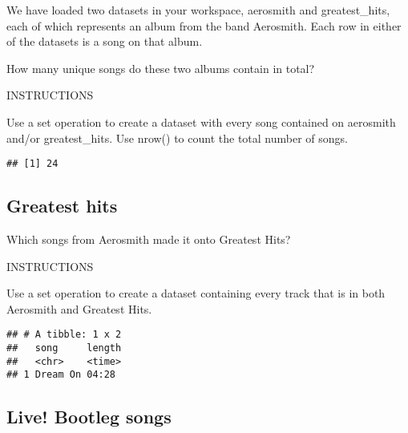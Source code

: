\documentclass[]{article}
\newenvironment{Shaded}{\begin{snugshade}}{\end{snugshade}}
\newcommand{\KeywordTok}[1]{\textcolor[rgb]{0.13,0.29,0.53}{\textbf{#1}}}
\newcommand{\StringTok}[1]{\textcolor[rgb]{0.31,0.60,0.02}{#1}}
\newcommand{\CommentTok}[1]{\textcolor[rgb]{0.56,0.35,0.01}{\textit{#1}}}
\newcommand{\OperatorTok}[1]{\textcolor[rgb]{0.81,0.36,0.00}{\textbf{#1}}}
\newcommand{\NormalTok}[1]{#1}
\begin{document}
We have loaded two datasets in your workspace, aerosmith and
greatest\_hits, each of which represents an album from the band
Aerosmith. Each row in either of the datasets is a song on that album.

How many unique songs do these two albums contain in total?

INSTRUCTIONS

Use a set operation to create a dataset with every song contained on
aerosmith and/or greatest\_hits. Use nrow() to count the total number of
songs.

\begin{Shaded}
\end{Shaded}

\begin{verbatim}
## [1] 24
\end{verbatim}

\subsection{Greatest hits}\label{greatest-hits}

Which songs from Aerosmith made it onto Greatest Hits?

INSTRUCTIONS

Use a set operation to create a dataset containing every track that is
in both Aerosmith and Greatest Hits.

\begin{Shaded}
\end{Shaded}

\begin{verbatim}
## # A tibble: 1 x 2
##   song     length
##   <chr>    <time>
## 1 Dream On 04:28
\end{verbatim}

\subsection{Live! Bootleg songs}\label{live-bootleg-songs}
\end{document}
